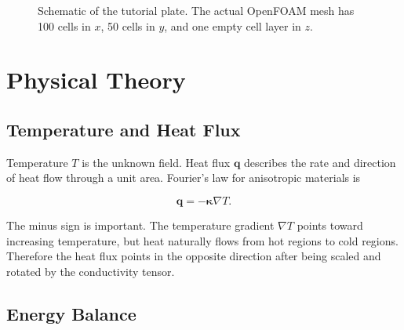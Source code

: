 \documentclass[11pt,a4paper]{article}
\newcommand{\code}[1]{\texttt{#1}}
\newcommand{\grad}{\nabla}
\newcommand{\kappatensor}{\boldsymbol{\kappa}}
\newcommand{\heatflux}{\boldsymbol{q}}
\begin{document}
\begin{figure}[h]
\centering
{}
\caption{Schematic of the tutorial plate. The actual OpenFOAM mesh has
100 cells in $x$, 50 cells in $y$, and one empty cell layer in $z$.}
\label{fig:tutorial-plate}
\end{figure}

\section{Physical Theory}

\subsection{Temperature and Heat Flux}

Temperature $T$ is the unknown field. Heat flux $\heatflux$ describes the rate
and direction of heat flow through a unit area. Fourier's law for anisotropic
materials is

\[
\heatflux = -\kappatensor \grad T.
\]

The minus sign is important. The temperature gradient $\grad T$ points toward
increasing temperature, but heat naturally flows from hot regions to cold
regions. Therefore the heat flux points in the opposite direction after being
scaled and rotated by the conductivity tensor.

\subsection{Energy Balance}
\end{document}
